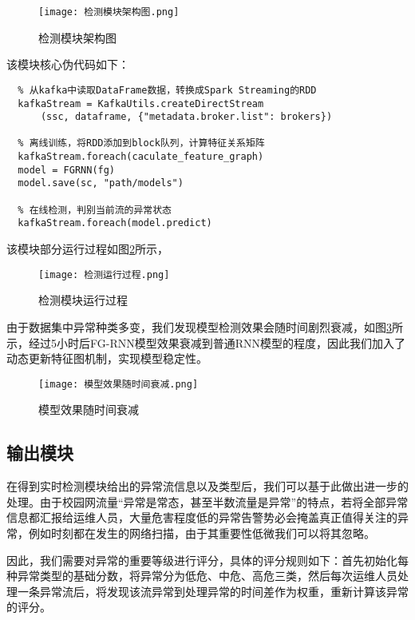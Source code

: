 \begin{figure}
  \centering
  \texttt{[image: 检测模块架构图.png]}
  \caption{检测模块架构图}
  \label{fig:检测模块架构图}
\end{figure}
该模块核心伪代码如下：
\begin{lstlisting}
  % 从kafka中读取DataFrame数据，转换成Spark Streaming的RDD
  kafkaStream = KafkaUtils.createDirectStream
      (ssc, dataframe, {"metadata.broker.list": brokers})

  % 离线训练，将RDD添加到block队列，计算特征关系矩阵
  kafkaStream.foreach(caculate_feature_graph)
  model = FGRNN(fg)
  model.save(sc, "path/models")
  
  % 在线检测，判别当前流的异常状态
  kafkaStream.foreach(model.predict)  
  \end{lstlisting}

该模块部分运行过程如图\ref{fig:检测模块运行过程}所示，

\begin{figure}
  \centering
  \texttt{[image: 检测运行过程.png]}
  \caption{检测模块运行过程}
  \label{fig:检测模块运行过程}
\end{figure}

由于数据集中异常种类多变，我们发现模型检测效果会随时间剧烈衰减，如图\ref{fig:模型效果随时间衰减}所示，经过5小时后FG-RNN模型效果衰减到普通RNN模型的程度，因此我们加入了动态更新特征图机制，实现模型稳定性。

\begin{figure}
  \centering
  \texttt{[image: 模型效果随时间衰减.png]}
  \caption{模型效果随时间衰减}
  \label{fig:模型效果随时间衰减}
\end{figure}

\subsection{输出模块}
在得到实时检测模块给出的异常流信息以及类型后，我们可以基于此做出进一步的处理。由于校园网流量“异常是常态，甚至半数流量是异常”的特点，若将全部异常信息都汇报给运维人员，大量危害程度低的异常告警势必会掩盖真正值得关注的异常，例如时刻都在发生的网络扫描，由于其重要性低微我们可以将其忽略。

因此，我们需要对异常的重要等级进行评分，具体的评分规则如下：首先初始化每种异常类型的基础分数，将异常分为低危、中危、高危三类，然后每次运维人员处理一条异常流后，将发现该流异常到处理异常的时间差作为权重，重新计算该异常的评分。




